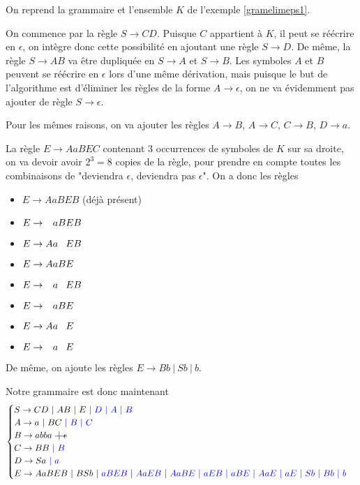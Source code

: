 \begin{example}
On reprend la grammaire et l'ensemble $K$ de l'exemple \ref{gramelimeps1}. 

On commence par la règle $S \rightarrow CD$. Puisque $C$ appartient à $K$, il peut se réécrire en $\epsilon$, on intègre donc cette possibilité en ajoutant une règle $S \rightarrow D$. De même, la règle $S \rightarrow AB$ va être dupliquée en $S \rightarrow A$ et $S \rightarrow B$. Les symboles $A$ et $B$ peuvent se réécrire en $\epsilon$ lors d'une même dérivation, mais puisque le but de l'algorithme est d'éliminer les règles de la forme $A \rightarrow \epsilon$, on ne va évidemment pas ajouter de règle $S \rightarrow \epsilon$.

Pour les mêmes raisons, on va ajouter les règles $A \rightarrow B$, $A \rightarrow C$, $C \rightarrow B$, $D \rightarrow a$. 

La règle $E \rightarrow AaBEC$ contenant 3 occurrences de symboles de $K$ sur sa droite, on va devoir avoir $2^3 = 8$ copies de la règle, pour prendre en compte toutes les combinaisons de "deviendra $\epsilon$, deviendra pas $\epsilon$". On a donc les règles 

\begin{itemize}
\item[] $E \rightarrow AaBEB$ (déjà présent)
\item[] $E \rightarrow \textcolor{white}{A}aBEB$
\item[] $E \rightarrow Aa\textcolor{white}{B}EB$
\item[] $E \rightarrow AaBE\textcolor{white}{B}$
\item[] $E \rightarrow \textcolor{white}{A}a\textcolor{white}{B}EB$
\item[] $E \rightarrow \textcolor{white}{A}aBE\textcolor{white}{B}$
\item[] $E \rightarrow Aa\textcolor{white}{B}E\textcolor{white}{B}$
\item[] $E \rightarrow \textcolor{white}{A}a\textcolor{white}{B}E\textcolor{white}{B}$
\end{itemize}

De même, on ajoute les règles $E \rightarrow Bb~|~Sb~|~b$.

Notre grammaire est donc maintenant 
\[
\begin{cases}
S \rightarrow CD~|~AB~|~E\textcolor{blue}{~|~D~|~A~|~B} \\
A \rightarrow a~|~BC\textcolor{blue}{~|~B~|~C} \\
B \rightarrow abba~\text{\st{$~|~\epsilon$}}\\
C \rightarrow BB\textcolor{blue}{~|~B} \\
D \rightarrow Sa\textcolor{blue}{~|~ a} \\
E \rightarrow AaBEB~|~BSb~|~\textcolor{blue}{aBEB~|~AaEB~|~AaBE~|~aEB~|~aBE~|~AaE~|~aE~|~Sb~|~Bb~|~b}
\end{cases}
\]

\end{example}

